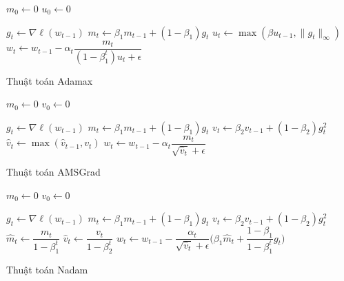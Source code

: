 \documentclass[14pt, a4paper]{article}
\theoremstyle{sltheorem}
\theoremstyle{soltheorem}
\begin{document}
\begin{algorithm}[h!]
    \DontPrintSemicolon

    $m_0 \gets 0$\;
    $u_0 \gets 0$\;

     {
        $g_t \gets \nabla \ell(w_{t-1})$\;
        $m_t \gets \beta_1 m_{t-1} + (1 - \beta_1)g_t$\;
        $u_t \gets \max (\beta u_{t-1}, \lVert g_t \rVert_{\infty})$\;
        $w_t \gets w_{t-1} - \alpha_t \dfrac{m_t}{(1-\beta_1^t)u_t + \epsilon}$\;
    }

    \;
    \caption{Thuật toán Adamax}
\end{algorithm}


\begin{algorithm}[h!]
    \DontPrintSemicolon

    $m_0 \gets 0$\;
    $v_0 \gets 0$\;

     {
        $g_t \gets \nabla \ell(w_{t-1})$\;
        $m_t \gets \beta_1 m_{t-1} + (1 - \beta_1)g_t$\;
        $v_t \gets \beta_2 v_{t-1} + (1 - \beta_2)g_t^2$\;
        $\hat{v}_t \gets \max(\hat{v}_{t-1}, v_t)$\;
        $w_t \gets w_{t-1} - \alpha_t \dfrac{m_t}{\sqrt{\hat{v}_t} + \epsilon}$\;
    }

    \;
    \caption{Thuật toán AMSGrad}
\end{algorithm}


\begin{algorithm}[h!]
    \DontPrintSemicolon

    $m_0 \gets 0$\;
    $v_0 \gets 0$\;

     {
        $g_t \gets \nabla \ell(w_{t-1})$\;
        $m_t \gets \beta_1 m_{t-1} + (1 - \beta_1)g_t$\;
        $v_t \gets \beta_2 v_{t-1} + (1 - \beta_2)g_t^2$\;
        $\hat{m}_t \gets \dfrac{m_t}{1 - \beta_1^t}$\;
        $\hat{v}_t \gets \dfrac{v_t}{1 - \beta_2^t}$\;
        $w_t \gets w_{t-1} - \dfrac{\alpha_t}{\sqrt{\hat{v}_t} + \epsilon} \Bigg( \beta_1 \hat{m}_t + \dfrac{1 - \beta_1}{1 - \beta_1^t}g_t \Bigg)$\;
    }

    \;
    \caption{Thuật toán Nadam}
\end{algorithm}
\end{document}
